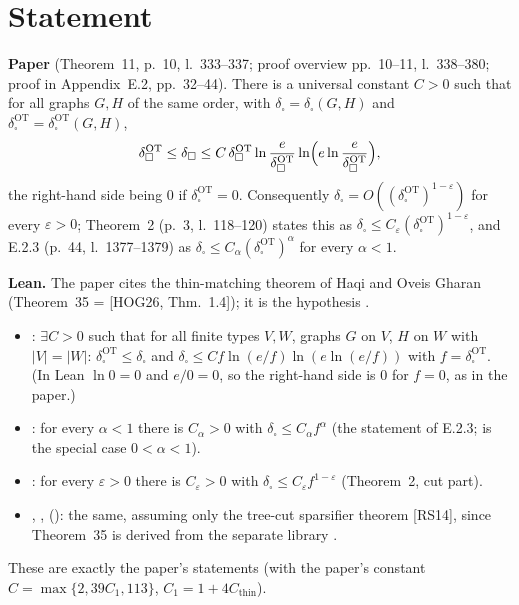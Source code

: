 

\paperversion

\section{Statement}
\textbf{Paper} (Theorem~11, p.~10, l.~333--337; proof overview pp.~10--11, l.~338--380; proof in Appendix~E.2, pp.~32--44).
There is a universal constant $C>0$ such that for all graphs $G,H$ of the same order, with
$\delta_\square=\delta_\square(G,H)$ and $\delta^{\mathrm{OT}}_\square=\delta^{\mathrm{OT}}_\square(G,H)$,
\[
\delta^{\mathrm{OT}}_\square\le\delta_\square\le C\,\delta^{\mathrm{OT}}_\square\ln\frac{e}{\delta^{\mathrm{OT}}_\square}
\ln\Bigl(e\ln\frac{e}{\delta^{\mathrm{OT}}_\square}\Bigr),
\]
the right-hand side being $0$ if $\delta^{\mathrm{OT}}_\square=0$. Consequently $\delta_\square=O((\delta^{\mathrm{OT}}_\square)^{1-\varepsilon})$
for every $\varepsilon>0$; Theorem~2 (p.~3, l.~118--120) states this as $\delta_\square\le C_\varepsilon(\delta^{\mathrm{OT}}_\square)^{1-\varepsilon}$,
and E.2.3 (p.~44, l.~1377--1379) as $\delta_\square\le C_\alpha(\delta^{\mathrm{OT}}_\square)^\alpha$ for every $\alpha<1$.

\textbf{Lean.} The paper cites the thin-matching theorem of Haqi and Oveis Gharan (Theorem~35 = [HOG26, Thm.~1.4]); it
is the hypothesis .
\begin{itemize}
\item {}: $\exists C>0$ such that for all finite types $V,W$, graphs $G$ on $V$, $H$ on $W$
with $|V|=|W|$: $\delta^{\mathrm{OT}}_\square\le\delta_\square$ and $\delta_\square\le C f\ln(e/f)\ln(e\ln(e/f))$ with
$f=\delta^{\mathrm{OT}}_\square$. (In Lean $\ln 0=0$ and $e/0=0$, so the right-hand side is $0$ for $f=0$, as in the paper.)
\item {}: for every $\alpha<1$ there is $C_\alpha>0$ with
$\delta_\square\le C_\alpha f^\alpha$ (the statement of E.2.3;  is the special case $0<\alpha<1$).
\item {}: for every $\varepsilon>0$ there is $C_\varepsilon>0$ with
$\delta_\square\le C_\varepsilon f^{1-\varepsilon}$ (Theorem~2, cut part).
\item {}, , 
(): the same, assuming only the tree-cut sparsifier theorem [RS14], since Theorem~35 is
derived from the separate library .
\end{itemize}
These are exactly the paper's statements (with the paper's constant $C=\max\{2,39C_1,113\}$, $C_1=1+4C_{\mathrm{thin}}$).

